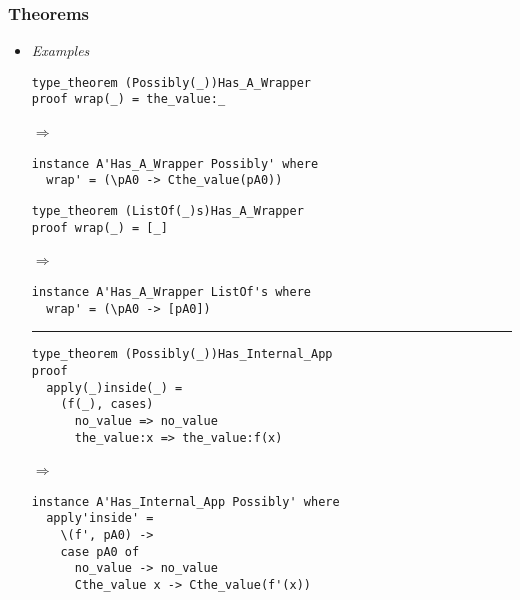 \documentclass{article}
\def\lra{$\Longrightarrow$\ }
\begin{document}
\newpage
\subsubsection{Theorems}

\begin{itemize}

\item
\textit{Examples}\\

\begin{minipage}{0.45\linewidth}

\begin{verbatim}
type_theorem (Possibly(_))Has_A_Wrapper
proof wrap(_) = the_value:_
\end{verbatim}

\lra

\begin{verbatim}
instance A'Has_A_Wrapper Possibly' where
  wrap' = (\pA0 -> Cthe_value(pA0))

\end{verbatim}

\end{minipage}
\hfill\vline\hfill
\begin{minipage}{0.50\linewidth}

\begin{verbatim}
type_theorem (ListOf(_)s)Has_A_Wrapper
proof wrap(_) = [_]
\end{verbatim}

\lra

\begin{verbatim}
instance A'Has_A_Wrapper ListOf's where
  wrap' = (\pA0 -> [pA0])

\end{verbatim}

\end{minipage}

\rule{\linewidth}{0.1pt}

\begin{verbatim}
type_theorem (Possibly(_))Has_Internal_App
proof
  apply(_)inside(_) =
    (f(_), cases)
      no_value => no_value
      the_value:x => the_value:f(x)
\end{verbatim}

\lra

\begin{verbatim}
instance A'Has_Internal_App Possibly' where
  apply'inside' =
    \(f', pA0) ->
    case pA0 of
      no_value -> no_value
      Cthe_value x -> Cthe_value(f'(x))
\end{verbatim}



\end{itemize}
\end{document}
